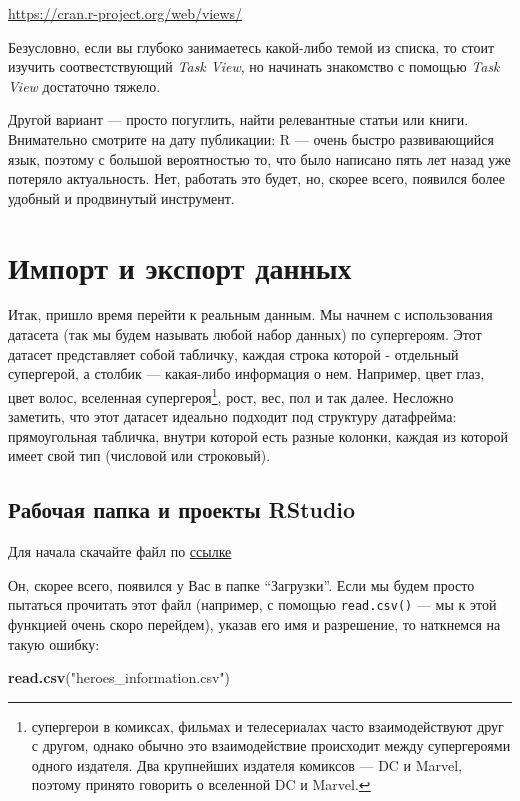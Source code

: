 \documentclass[]{book}
\newenvironment{Shaded}{\begin{snugshade}}{\end{snugshade}}
\newcommand{\KeywordTok}[1]{\textcolor[rgb]{0.13,0.29,0.53}{\textbf{#1}}}
\newcommand{\StringTok}[1]{\textcolor[rgb]{0.31,0.60,0.02}{#1}}
\newcommand{\NormalTok}[1]{#1}
\begin{document}
\url{https://cran.r-project.org/web/views/}

Безусловно, если вы глубоко занимаетесь какой-либо темой из списка, то
стоит изучить соотвестствующий \emph{Task View}, но начинать знакомство
с помощью \emph{Task View} достаточно тяжело.

Другой вариант --- просто погуглить, найти релевантные статьи или книги.
Внимательно смотрите на дату публикации: R --- очень быстро
развивающийся язык, поэтому с большой вероятностью то, что было написано
пять лет назад уже потеряло актуальность. Нет, работать это будет, но,
скорее всего, появился более удобный и продвинутый инструмент.

\chapter{Импорт и экспорт данных}\label{real_data}

Итак, пришло время перейти к реальным данным. Мы начнем с использования
датасета (так мы будем называть любой набор данных) по супергероям. Этот
датасет представляет собой табличку, каждая строка которой - отдельный
супергерой, а столбик --- какая-либо информация о нем. Например, цвет
глаз, цвет волос, вселенная супергероя\footnote{супергерои в комиксах,
  фильмах и телесериалах часто взаимодействуют друг с другом, однако
  обычно это взаимодействие происходит между супергероями одного
  издателя. Два крупнейших издателя комиксов --- DC и Marvel, поэтому
  принято говорить о вселенной DC и Marvel.}, рост, вес, пол и так
далее. Несложно заметить, что этот датасет идеально подходит под
структуру датафрейма: прямоугольная табличка, внутри которой есть разные
колонки, каждая из которой имеет свой тип (числовой или строковый).

\section{Рабочая папка и проекты RStudio}\label{wd}

Для начала скачайте файл по
\href{https://raw.githubusercontent.com/agricolamz/2020-2021-ds4dh/master/data/heroes_information.csv}{ссылке}

Он, скорее всего, появился у Вас в папке ``Загрузки''. Если мы будем
просто пытаться прочитать этот файл (например, с помощью
\texttt{read.csv()} --- мы к этой функцией очень скоро перейдем), указав
его имя и разрешение, то наткнемся на такую ошибку:

\begin{Shaded}
\begin{Highlighting}[]
\KeywordTok{read.csv}\NormalTok{(}\StringTok{"heroes_information.csv"}\NormalTok{)}
\end{Highlighting}
\end{Shaded}
\end{document}
